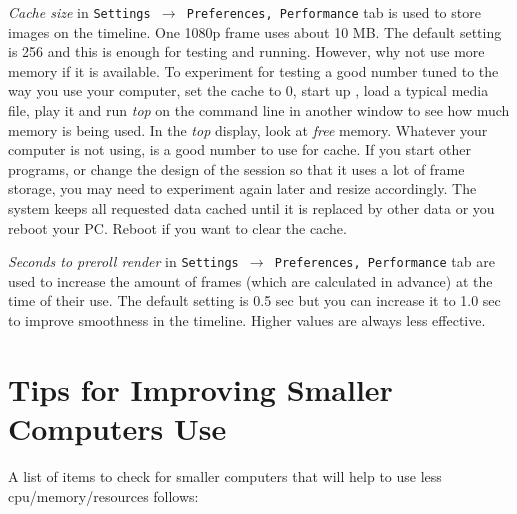 \textit{Cache size} in \texttt{Settings $\rightarrow$ Preferences, Performance} tab is used to store images on the timeline.  One 1080p frame uses about 10 MB.  The default setting is 256 and this is enough for testing and running.  However, why not use more memory if it is available.   To experiment for testing a good number tuned to the way you use your computer, set the cache to 0, start up \CGG{}, load a typical media file, play it and run \textit{top} on the command line in another window to see how much memory is being used.  In the \textit{top} display, look at \textit{free} memory.  Whatever your computer is not using, is a good number to use for cache.  If you start other programs, or change the design of the session so that it uses a lot of frame storage, you may need to experiment again later and resize accordingly. The system keeps all requested data cached until it is replaced by other data or you reboot your PC. Reboot if you want to clear the cache.

\textit{Seconds to preroll render} in \texttt{Settings $\rightarrow$ Preferences, Performance} tab are used to increase the amount of frames (which are calculated in advance) at the time of their use. The default setting is 0.5 sec but you can increase it to 1.0 sec to improve smoothness in the timeline. Higher values are always less effective.

\section{Tips for Improving Smaller Computers Use}%
\label{sec:tips_improving_smaller_computers}

A list of items to check for smaller computers that will help to use less cpu/memory/resources follows:


